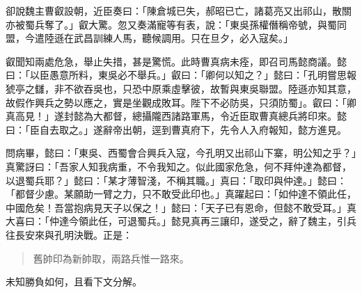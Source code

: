 卻說魏主曹叡設朝，近臣奏曰：「陳倉城已失，郝昭已亡，諸葛亮又出祁山，散關亦被蜀兵奪了。」叡大驚。忽又奏滿寵等有表，說：「東吳孫權僭稱帝號，與蜀同盟，今遣陸遜在武昌訓練人馬，聽候調用。只在旦夕，必入寇矣。」

叡聞知兩處危急，舉止失措，甚是驚慌。此時曹真病未痊，即召司馬懿商議。懿曰：「以臣愚意所料，東吳必不舉兵。」叡曰：「卿何以知之？」懿曰：「孔明嘗思報猇亭之讎，非不欲吞吳也，只恐中原乘虛擊彼，故暫與東吳聯盟。陸遜亦知其意，故假作興兵之勢以應之，實是坐觀成敗耳。陛下不必防吳，只須防蜀」。叡曰：「卿真高見！」遂封懿為大都督，總攝隴西諸路軍馬，令近臣取曹真總兵將印來。懿曰：「臣自去取之。」遂辭帝出朝，逕到曹真府下，先令人入府報知，懿方進見。

問病畢，懿曰：「東吳、西蜀會合興兵入寇，今孔明又出祁山下寨，明公知之乎？」真驚訝曰：「吾家人知我病重，不令我知之。似此國家危急，何不拜仲達為都督，以退蜀兵耶？」懿曰：「某才薄智淺，不稱其職。」真曰：「取印與仲達。」懿曰：「都督少慮。某願助一臂之力，只不敢受此印也。」真躍起曰：「如仲達不領此任，中國危矣！吾當抱病見天子以保之！」懿曰：「天子已有恩命，但懿不敢受耳。」真大喜曰：「仲達今領此任，可退蜀兵。」懿見真再三讓印，遂受之，辭了魏主，引兵往長安來與孔明決戰。正是：

\begin{quote}
舊帥印為新帥取，兩路兵惟一路來。
\end{quote}

未知勝負如何，且看下文分解。
